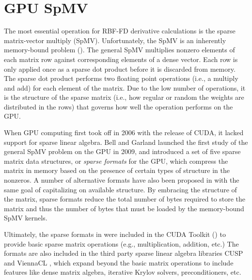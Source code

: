 \documentclass{report}
\begin{document}
\fi

\chapter{GPU SpMV}
\label{chap:gpu_rbffd}

The most essential operation for RBF-FD derivative calculations is the sparse matrix-vector multiply (SpMV). 
Unfortunately, the SpMV is an inherently memory-bound problem (\cite{Bell2009, SuKeutzer2012, Kreutzer2012}). The general SpMV multiplies nonzero elements of each matrix row against corresponding elements of a dense vector. Each row is only applied once as a sparse dot product before it is discarded from memory. The sparse dot product performs two floating point operations (i.e., a multiply and add) for each element of the matrix. %
Due to the low number of operations, it is the structure of the sparse matrix (i.e., how regular or random the weights are distributed in the rows) that governs how well the operation performs on the GPU. %

When GPU computing first took off in 2006 with the release of CUDA, it lacked support for sparse linear algebra. Bell and Garland \cite{Bell2009} launched the first study of the general SpMV problem on the GPU in 2009, and introduced a set of five sparse matrix data structures, or \emph{sparse formats} for the GPU, which compress the matrix in memory based on the presence of certain types of structure in the nonzeros. 
A number of alternative formats have also been proposed in \cite{SuKeutzer2012,Kreutzer2012,LiSaad2010} with the same goal of capitalizing on available structure. By embracing the structure of the matrix, sparse formats reduce the total number of bytes required to store the matrix and thus the number of bytes that must be loaded by the memory-bound SpMV kernels. 

Ultimately, the sparse formats in \cite{Bell2009} were included in the CUDA Toolkit (\cite{CudaToolkitDoc}) to provide basic sparse matrix operations (e.g., multiplication, addition, etc.) The formats are also included in the third party sparse linear algebra libraries CUSP \cite{Cusp2012} and ViennaCL \cite{Rupp2010,Rupp2010a}, which expand beyond the basic matrix operations to include features like dense matrix algebra, iterative Krylov solvers, preconditioners, etc. 
\end{document}
